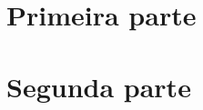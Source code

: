 \documentclass[
  11pt,
  twoside,          %
  openright,        %
  a5paper,          %
  onecolumn,
  brazil
]{memoir}
\begin{document}
\frontmatter





\tableofcontents*
\cleardoublepage



\mainmatter

\part{Primeira parte}




\part{Segunda parte}



\backmatter



\lkPrintBibliography

\clearpage
\printindex
\end{document}

